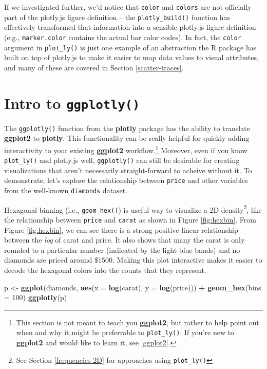 \documentclass[
  12pt,
]{krantz}
\newenvironment{Shaded}{\begin{snugshade}}{\end{snugshade}}
\newcommand{\DataTypeTok}[1]{\textcolor[rgb]{0.13,0.29,0.53}{#1}}
\newcommand{\DecValTok}[1]{\textcolor[rgb]{0.00,0.00,0.81}{#1}}
\newcommand{\KeywordTok}[1]{\textcolor[rgb]{0.13,0.29,0.53}{\textbf{#1}}}
\newcommand{\NormalTok}[1]{#1}
\newcommand{\OperatorTok}[1]{\textcolor[rgb]{0.81,0.36,0.00}{\textbf{#1}}}
\newcommand{\StringTok}[1]{\textcolor[rgb]{0.31,0.60,0.02}{#1}}
\begin{document}
If we investigated further, we'd notice that \texttt{color} and \texttt{colors} are not officially part of the plotly.js figure definition -- the \texttt{plotly\_build()} function has effectively transformed that information into a sensible plotly.js figure definition (e.g., \texttt{marker.color} contains the actual bar color codes). In fact, the \texttt{color} argument in \texttt{plot\_ly()} is just one example of an abstraction the R package has built on top of plotly.js to make it easier to map data values to visual attributes, and many of these are covered in Section \ref{scatter-traces}.

\hypertarget{intro-ggplotly}{%
\section{\texorpdfstring{Intro to \texttt{ggplotly()}}{Intro to ggplotly()}}\label{intro-ggplotly}}

The \texttt{ggplotly()} function from the \textbf{plotly} package has the ability to translate \textbf{ggplot2} to \textbf{plotly}. This functionality can be really helpful for quickly adding interactivity to your existing \textbf{ggplot2} workflow.\footnote{This section is not meant to teach you \textbf{ggplot2}, but rather to help point out when and why it might be preferrable to \texttt{plot\_ly()}. If you're new to \textbf{ggplot2} and would like to learn it, see \ref{ggplot2}.} Moreover, even if you know \texttt{plot\_ly()} and plotly.js well, \texttt{ggplotly()} can still be desirable for creating visualizations that aren't necessarily straight-forward to acheive without it. To demonstrate, let's explore the relationship between \texttt{price} and other variables from the well-known \texttt{diamonds} dataset.

Hexagonal binning (i.e., \texttt{geom\_hex()}) is useful way to visualize a 2D density\footnote{See Section \ref{frequencies-2D} for approaches using \texttt{plot\_ly()}}, like the relationship between \texttt{price} and \texttt{carat} as shown in Figure \ref{fig:hexbin}. From Figure \ref{fig:hexbin}, we can see there is a strong positive linear relationship between the \emph{log} of carat and price. It also shows that many the carat is only rounded to a particular number (indicated by the light blue bands) and no diamonds are priced around \$1500. Making this plot interactive makes it easier to decode the hexagonal colors into the counts that they represent.

\begin{Shaded}
\begin{Highlighting}[]
\NormalTok{p <-}\StringTok{ }\KeywordTok{ggplot}\NormalTok{(diamonds, }\KeywordTok{aes}\NormalTok{(}\DataTypeTok{x =} \KeywordTok{log}\NormalTok{(carat), }\DataTypeTok{y =} \KeywordTok{log}\NormalTok{(price))) }\OperatorTok{+}\StringTok{ }
\StringTok{  }\KeywordTok{geom_hex}\NormalTok{(}\DataTypeTok{bins =} \DecValTok{100}\NormalTok{)}
\KeywordTok{ggplotly}\NormalTok{(p)}
\end{Highlighting}
\end{Shaded}
\end{document}

